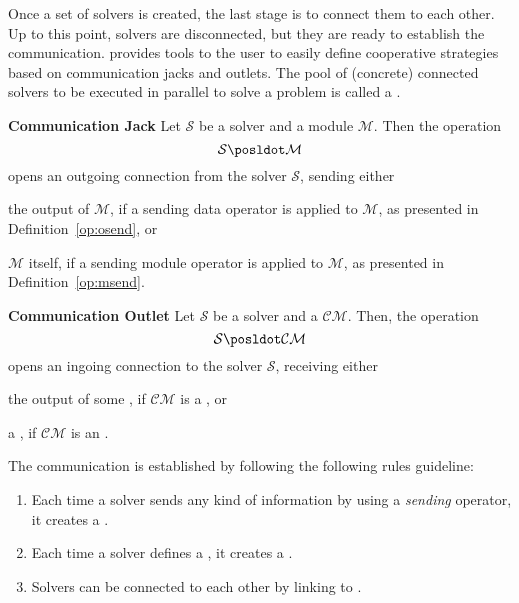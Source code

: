 Once a set of solvers is created, the last stage is to connect them to each other. Up to this point, solvers are disconnected, but they are ready to establish the communication. \posl{} provides tools  to the user to easily define cooperative strategies based on communication jacks and outlets. The pool of (concrete) connected solvers to be executed in parallel to solve a problem is called a \INTROsoset{}. 


\begin{definition}\label{def:comm_jack}
{\bf Communication Jack} Let $\mathcal{S}$ be a solver and a module $\mathcal{M}$. Then the operation $$\mathcal{S}\posldot\mathcal{M}$$ opens an outgoing connection from the solver $\mathcal{S}$, sending either 
\begin{inparaenum}[a)]
	\item the output of $\mathcal{M}$, if a sending data operator is applied to $\mathcal{M}$, as presented in Definition~\ref{op:osend}, or
	\item $\mathcal{M}$ itself, if a sending module operator is applied to $\mathcal{M}$, as presented in Definition~\ref{op:msend}.
\end{inparaenum}
\end{definition} 

\begin{definition}\label{def:comm_outlet}
{\bf Communication Outlet} Let $\mathcal{S}$ be a solver and a \opch{} $\mathcal{CM}$. Then, the operation $$\mathcal{S}\posldot\mathcal{CM}$$ opens an ingoing connection to the solver $\mathcal{S}$, receiving either 
\begin{inparaenum}[a)]
	\item the output of some \om{}, if $\mathcal{CM}$ is a \dopch{}, or
	\item a \om{}, if $\mathcal{CM}$ is an \oopch.
\end{inparaenum}
\end{definition} 

\separation

The communication is established by following the following rules guideline:
\begin{enumerate}%
	\item Each time a solver sends any kind of information by using a {\it sending} operator, it creates a \INTROjack.
	\item Each time a solver defines a \opch, it creates a \INTROoutlet. 
	\item Solvers can be connected to each other by linking \jacks{} to \outlets.
\end{enumerate} %

